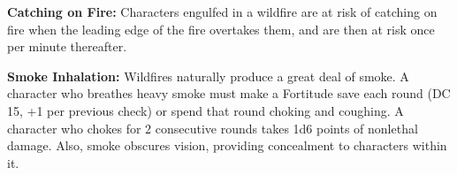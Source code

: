 \textbf{Catching on Fire:} Characters engulfed in a wildfire are at risk of catching on fire when the leading edge of the fire overtakes them, and are then at risk once per minute thereafter.

\textbf{Smoke Inhalation:} Wildfires naturally produce a great deal of smoke. A character who breathes heavy smoke must make a Fortitude save each round (DC 15, +1 per previous check) or spend that round choking and coughing. A character who chokes for 2 consecutive rounds takes 1d6 points of nonlethal damage. Also, smoke obscures vision, providing concealment to characters within it.